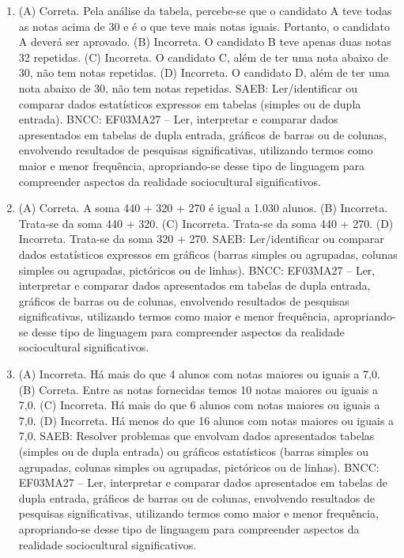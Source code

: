 \begin{enumerate}
\item
(A) Correta. Pela análise da tabela, percebe-se que o candidato A teve todas as notas
acima de 30 e é o que teve mais notas iguais. Portanto, o candidato A
deverá ser aprovado.
(B) Incorreta. O candidato B teve apenas duas notas 32 repetidas.
(C) Incorreta. O candidato C, além de ter uma nota abaixo de 30, não tem notas repetidas.
(D) Incorreta. O candidato D, além de ter uma nota abaixo de 30, não tem notas repetidas.
SAEB: Ler/identificar ou comparar dados estatísticos expressos em tabelas (simples ou de dupla entrada). 
BNCC: EF03MA27 -- Ler, interpretar e comparar dados apresentados em tabelas de dupla entrada,
gráficos de barras ou de colunas, envolvendo resultados de pesquisas significativas, utilizando
termos como maior e menor frequência, apropriando-se desse tipo de linguagem para
compreender aspectos da realidade sociocultural significativos.

\item
(A) Correta.  A soma 440 + 320 + 270 é igual a 1.030 alunos.
(B) Incorreta. Trata-se da soma 440 + 320.
(C) Incorreta. Trata-se da soma 440 + 270.
(D) Incorreta. Trata-se da soma 320 + 270.
SAEB: Ler/identificar ou comparar dados estatísticos expressos em gráficos (barras simples ou agrupadas, colunas simples ou agrupadas, pictóricos ou de linhas). 
BNCC: EF03MA27 -- Ler, interpretar e comparar dados apresentados em tabelas de dupla entrada,
gráficos de barras ou de colunas, envolvendo resultados de pesquisas significativas, utilizando
termos como maior e menor frequência, apropriando-se desse tipo de linguagem para
compreender aspectos da realidade sociocultural significativos.

\item
(A) Incorreta. Há mais do que 4 alunos com notas maiores ou iguais a 7,0.
(B) Correta. Entre as notas fornecidas temos 10 notas maiores ou iguais a 7,0.
(C) Incorreta. Há mais do que 6 alunos com notas maiores ou iguais a 7,0.
(D) Incorreta. Há menos do que 16 alunos com notas maiores ou iguais a 7,0.
SAEB: Resolver problemas que envolvam dados apresentados tabelas (simples ou de dupla entrada) ou gráficos estatísticos (barras simples ou agrupadas, colunas simples ou agrupadas, pictóricos ou de linhas). 
BNCC: EF03MA27 -- Ler, interpretar e comparar dados apresentados em tabelas de dupla entrada,
gráficos de barras ou de colunas, envolvendo resultados de pesquisas significativas, utilizando
termos como maior e menor frequência, apropriando-se desse tipo de linguagem para
compreender aspectos da realidade sociocultural significativos.
\end{enumerate}

